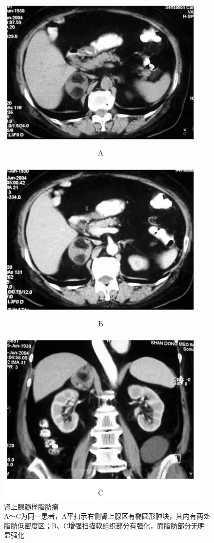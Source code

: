 \begin{figure}[!htbp]
 \centering
 \includegraphics[width=.7\textwidth,height=\textheight,keepaspectratio]{./images/Image00349.jpg}
 \captionsetup{justification=centering}
 \caption{肾上腺髓样脂肪瘤\\{\small A～C为同一患者，A平扫示右侧肾上腺区有椭圆形肿块，其内有两处脂肪低密度区；B、C增强扫描软组织部分有强化，而脂肪部分无明显强化}}
 \label{fig16-5}
  \end{figure} 


